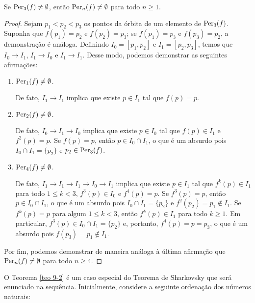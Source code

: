 \begin{theorem}\label{teo 9-2}
Se $\operatorname{Per}_3(f) \neq \emptyset$, então $\operatorname{Per}_n(f) \neq \emptyset$ para todo $n \geq 1$.
\end{theorem}

\begin{proof}
Sejam $p_1 < p_2 < p_3$ os pontos da órbita de um elemento de $\operatorname{Per}_3(f)$. Suponha que $f(p_1) = p_2$ e $f(p_2) = p_3$; se $f(p_1) = p_3$ e $f(p_3) = p_2$, a demonstração é análoga.
Definindo $I_0 = [p_1, p_2]$ e $I_1 = [p_2, p_3]$, temos que $I_0 \longrightarrow I_1$, $I_1 \longrightarrow I_0$ e $I_1 \longrightarrow I_1$. Desse modo, podemos demonstrar as seguintes afirmações:

\begin{enumerate}[label=\alph*)]
\item \textit{$\operatorname{Per}_1(f) \neq \emptyset$.}

De fato, $I_1 \longrightarrow I_1$ implica que existe $p \in I_1$ tal que $f(p) = p$.

\item \textit{$\operatorname{Per}_2(f) \neq \emptyset$.}

De fato, $I_0 \longrightarrow I_1 \longrightarrow I_0$ implica que existe $p \in I_0$ tal que $f(p) \in I_1$ e $f^2(p) = p$.
Se $f(p) = p$, então $p \in I_0 \cap I_1$, o que é um absurdo pois $I_0 \cap I_1 = \lbrace p_2 \rbrace$ e $p_2 \in \operatorname{Per}_3(f)$.

\item \textit{$\operatorname{Per}_4(f) \neq \emptyset$.}

De fato, $I_1 \longrightarrow I_1 \longrightarrow I_1 \longrightarrow I_0 \longrightarrow I_1$ implica que existe $p \in I_1$ tal que $f^k(p) \in I_1$ para todo $1 \leq k < 3$, $f^3(p) \in I_0$ e $f^4(p) = p$.
Se $f^3(p) = p$, então $p \in I_0 \cap I_1$, o que é um absurdo pois $I_0 \cap I_1 = \lbrace p_2 \rbrace$ e $f^2(p_2) = p_1 \notin I_1$.
Se $f^k(p) = p$ para algum $1 \leq k < 3$, então $f^k(p) \in I_1$ para todo $k \geq 1$.
Em particular, $f^3(p) \in I_0 \cap I_1 = \lbrace p_2 \rbrace$ e, portanto, $f^4(p) = p = p_3$, o que é um absurdo pois $f(p_3) = p_1 \notin I_1$.
\end{enumerate}

Por fim, podemos demonstrar de maneira análoga à última afirmação que $\operatorname{Per}_n(f) \neq \emptyset$ para todo $n \geq 4$.
\end{proof}

O Teorema \ref{teo 9-2} é um caso especial do Teorema de Sharkovsky que será enunciado na sequência.
Inicialmente, considere a seguinte ordenação dos números naturais:

